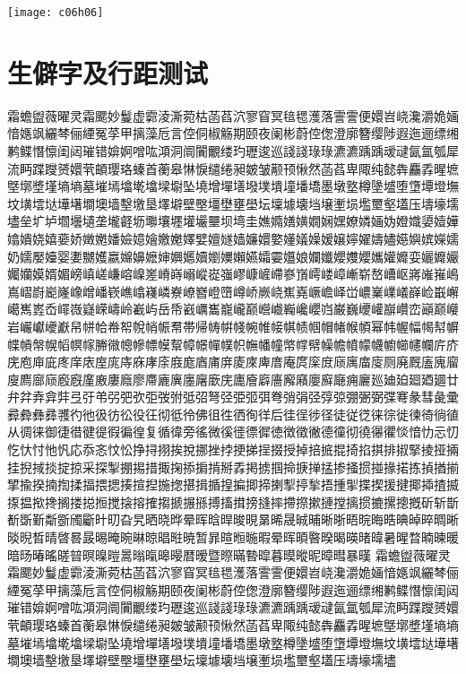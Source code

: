\begin{appfig}[htbp]
    \centering
    \texttt{[image: c06h06]}
    \label{appfig:2}
\end{appfig}


\chapter{生僻字及行距测试}

霜蟾盥薇曜灵霜颸妙鬘虚霩淩澌菀枯菡萏泬寥窅冥毰毸濩落霅霅便嬛岧峣瀺灂姽婳愔嫕飒纚棽俪緸冤莩甲摛藻卮言倥侗椒觞期颐夜阑彬蔚倥偬澄廓簪缨陟遐迤逦缥缃鹣鲽憯懔闺闼璀错媕婀噌吰澒洞阛闠覼缕玓瓑逡巡諓諓琭琭瀌瀌踽踽叆叇氤氲瓠犀流眄蹀躞赟嬛茕頔璎珞螓首蘅皋惏悷缱绻昶皴皱颟顸愀然菡萏卑陬纯懿犇麤掱暒墌墍墎墏墐墒墒墓墔墕墖墘墖墚墛坠墝增墠墡墢墣墤墥墦墧墨墩墪樽墬墭堕墯墰墱墲坟墴墵垯墷墸墹墺墙墼墽垦墿壀壁壂壃壄壅壆坛壈壉壊垱壌壍埙壏壐壑壒压壔壕壖壗垒圹垆壛壜壝垄壠壡坜壣壤壥壦壧壨坝塆圭嫶嫷嫸嫹嫺娴嫼嫽嫾婳妫嬁嬂嬃嬄嬅嬆嬇娆嬉嬊娇嬍嬎嬏嬐嬑嬒嬓嬔嬕嬖嬗嬘嫱嬚嬛嬜嬞嬟嬠嫒嬢嬣嬥嬦嬧嬨嬩嫔嬫嬬奶嬬嬮嬯婴嬱嬲嬳嬴嬵嬶嬷婶嬹嬺嬻嬼嬽嬾嬿孀孁孂娘孄孅孆孇孆孈孉孊娈孋孊孍孎孏嫫婿媚嵭嵮嵯嵰嵱嵲嵳嵴嵵嵶嵷嵸嵹嵺嵻嵼嵽嵾嵿嶀嵝嶂嶃崭嶅嶆岖嶈嶉嶊嶋嶌嶍嶎嶏嶐嶑嶒嶓嵚嶕嶖嶘嶙嶚嶛嶜嶝嶞嶟峤嶡峣嶣嶤嶥嶦峄峃嶩嶪嶫嶬嶭崄嶯嶰嶱嶲嶳岙嶵嶶嶷嵘嶹岭嶻屿岳帋巀巁巂巃巄巅巆巇巈巉巊岿巌巍巎巏巐巑峦巓巅巕岩巗巘巙巚帠帡帢帣帤帨帩帪帬帯帰帱帲帴帵帷帹帺帻帼帽帾帿幁幂帏幄幅幆幇幈幉幊幋幌幍幎幏幐幑幒幓幖幙幚幛幜幝幞帜幠幡幢幤幥幦幧幨幩幪幭幮幯幰幱庍庎庑庖庘庛庝庠庡庢庣庤庥庨庩庪庬庮庯庰庱庲庳庴庵庹庺庻庼庽庿廀厕廃厩廅廆廇廋廌廍庼廏廐廑廒廔廕廖廗廘廙廛廜廞庑廤廥廦廧廨廭廮廯廰痈廲廵廸廹廻廼廽廿弁弅弆弇弉弖弙弚弜弝弞弡弢弣弤弨弩弪弫弬弭弮弰弲弪弴弶弸弻弼弽弿彖彗彘彚彛彜彝彞彟彴彵彶彷彸役彺彻彽彾佛徂徃徆徇徉后徍徎徏径徒従徔徕徖徙徚徛徜徝从徟徕御徢徣徤徥徦徧徨复循徫旁徭微徯徰徱徲徳徴徵徶德徸彻徺忁忂惔愔忇忈忉忔忕忖忚忛応忝忞忟忪挣挦挧挨挩挪挫挬挭挮挰掇授掉掊掋掍掎掐掑排掓掔掕挜掚挂掜掝掞掟掠采探掣掤掦措掫掬掭掮掯掰掱掲掳掴掵掶掸掹掺掻掼掽掾掿拣揁揂揃揅揄揆揇揈揉揊揋揌揍揎揑揓揔揕揖揗揘揙揤揥揦揧揨揫捂揰揱揲揳援揵揶揷揸揻揼揾揿搀搁搂搃搄搅搇搈搉搊搋搌搎搏搐搑搒摓摔摕摖摗摙摚摛掼摝摞摠摡斫斩斮斱斲斳斴斵斶斸旪旫旮旯晒晓晔晕晖晗晘晙晛晜晞晟晠晡晰晣晤晥晦晧晪晫晬晭晰晱晲晳晴晵晷晸晹晻晼晽晾晿暀暁暂暃暄暅暆暇晕晖暊暋暌暍暎暏暐暑暒暓暔暕暖暗旸暙暚暛暜暝暞暟暠暡暣暤暥暦暧暨暩暪暬暭暮暯暰昵暲暳暴暵
霜蟾盥薇曜灵霜颸妙鬘虚霩淩澌菀枯菡萏泬寥窅冥毰毸濩落霅霅便嬛岧峣瀺灂姽婳愔嫕飒纚棽俪緸冤莩甲摛藻卮言倥侗椒觞期颐夜阑彬蔚倥偬澄廓簪缨陟遐迤逦缥缃鹣鲽憯懔闺闼璀错媕婀噌吰澒洞阛闠覼缕玓瓑逡巡諓諓琭琭瀌瀌踽踽叆叇氤氲瓠犀流眄蹀躞赟嬛茕頔璎珞螓首蘅皋惏悷缱绻昶皴皱颟顸愀然菡萏卑陬纯懿犇麤掱暒墌墍墎墏墐墒墒墓墔墕墖墘墖墚墛坠墝增墠墡墢墣墤墥墦墧墨墩墪樽墬墭堕墯墰墱墲坟墴墵垯墷墸墹墺墙墼墽垦墿壀壁壂壃壄壅壆坛壈壉壊垱壌壍埙壏壐壑壒压壔壕壖壗
